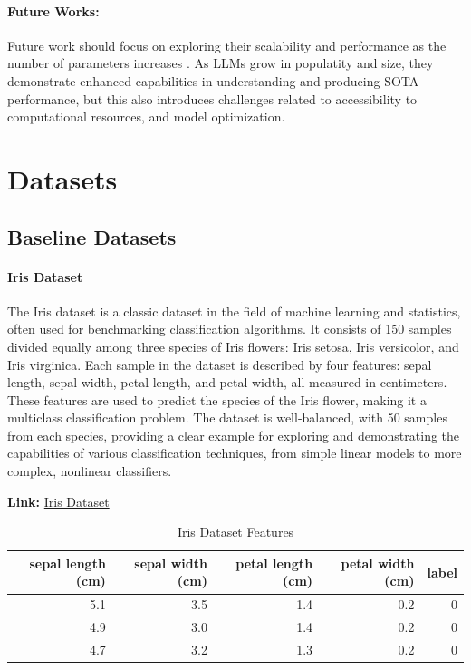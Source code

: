 \documentclass{article}
\theoremstyle{plain}
\theoremstyle{definition}
\theoremstyle{remark}
\begin{document}
\paragraph{Future Works: } Future work should focus on exploring their scalability and performance as the number of parameters increases \cite{kaplan2020scaling}. As LLMs grow in populatity and size, they demonstrate enhanced capabilities in understanding and producing SOTA performance, but this also introduces challenges related to accessibility to computational resources, and model optimization. 


\newpage
\section{Datasets}
\label{dataset}
\subsection{Baseline Datasets}
\paragraph{Iris Dataset} The Iris dataset \cite{misc_iris_53} is a classic dataset in the field of machine learning and statistics, often used for benchmarking classification algorithms. It consists of 150 samples divided equally among three species of Iris flowers: Iris setosa, Iris versicolor, and Iris virginica. Each sample in the dataset is described by four features: sepal length, sepal width, petal length, and petal width, all measured in centimeters. These features are used to predict the species of the Iris flower, making it a multiclass classification problem. The dataset is well-balanced, with 50 samples from each species, providing a clear example for exploring and demonstrating the capabilities of various classification techniques, from simple linear models to more complex, nonlinear classifiers.


\textbf{Link: }\href{https://archive.ics.uci.edu/dataset/53/iris}{Iris Dataset} 
\begin{table}[h!]
    \centering
    \caption{Iris Dataset Features}
\begin{adjustbox}{width=5in}
\begin{tabular}{rrrrr}
\toprule
 sepal length (cm) &  sepal width (cm) &  petal length (cm) &  petal width (cm) &  label \\
\midrule
               5.1 &               3.5 &                1.4 &               0.2 &      0 \\
               4.9 &               3.0 &                1.4 &               0.2 &      0 \\
               4.7 &               3.2 &                1.3 &               0.2 &      0 \\
\bottomrule
\end{tabular}
\end{adjustbox}
\end{table}
\end{document}
